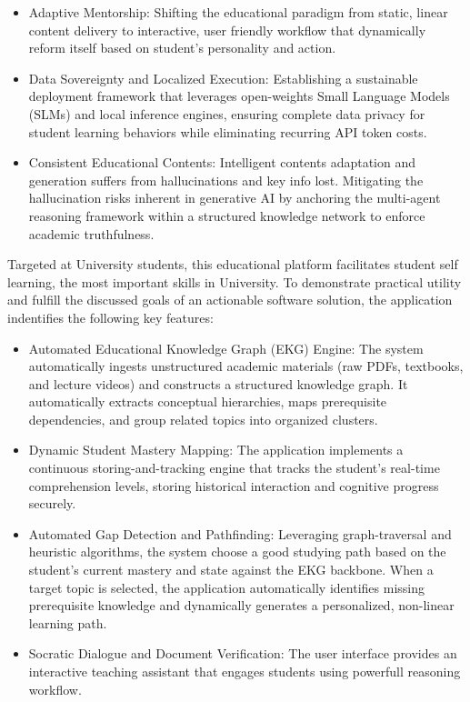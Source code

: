 \begin{itemize}
    \item {Adaptive Mentorship:} Shifting the educational paradigm from static, linear content delivery to interactive, user friendly workflow 
    that dynamically reform itself based on student's personality and action.
    \item {Data Sovereignty and Localized Execution:} Establishing a sustainable deployment framework that leverages open-weights Small Language Models 
    (SLMs) and local inference engines, ensuring complete data privacy for student learning behaviors while eliminating recurring API token costs.
    \item {Consistent Educational Contents:} Intelligent contents adaptation and generation suffers from hallucinations and key info lost. Mitigating the 
    hallucination risks inherent in generative AI by anchoring the multi-agent reasoning framework within a 
    structured knowledge network to enforce academic truthfulness.
\end{itemize}

Targeted at University students, this educational platform facilitates student self learning, the most important skills in University. 
To demonstrate practical utility and fulfill the discussed goals of an actionable software solution, the application indentifies the following 
key features:
\begin{itemize}
    \item {Automated Educational Knowledge Graph (EKG) Engine:} The system automatically ingests unstructured academic materials 
    (raw PDFs, textbooks, and lecture videos) and constructs a structured knowledge graph. It automatically extracts conceptual hierarchies, 
    maps prerequisite dependencies, and group related topics into organized clusters.
    \item {Dynamic Student Mastery Mapping:} The application implements a continuous storing-and-tracking engine that tracks the student's real-time 
    comprehension levels, storing historical interaction and cognitive progress securely.
    \item {Automated Gap Detection and Pathfinding:} Leveraging graph-traversal and heuristic algorithms, the system choose a good studying path based on 
    the student's current mastery and state against the EKG backbone. When a target topic is selected, the application automatically identifies missing prerequisite 
    knowledge and dynamically generates a personalized, non-linear learning path.
    \item {Socratic Dialogue and Document Verification:} The user interface provides an interactive teaching assistant that engages students using powerfull 
    reasoning workflow.
\end{itemize}

